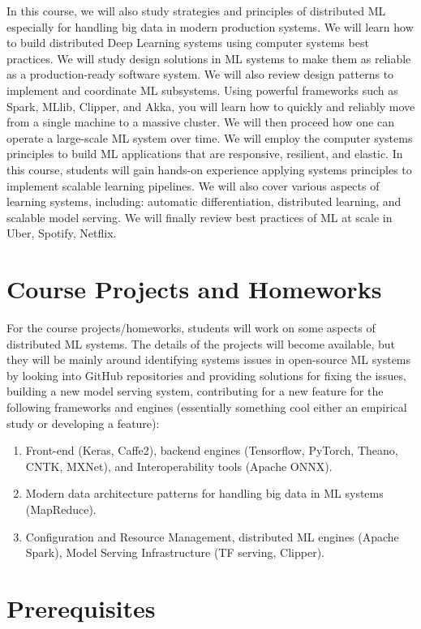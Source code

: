 \documentclass[11pt]{article}
\begin{document}
In this course, we will also study strategies and principles of distributed ML especially for handling big data in modern production systems. We will learn how to build distributed Deep Learning systems using computer systems best practices. We will study design solutions in ML systems to make them as reliable as a production-ready software system. We will also review design patterns to implement and coordinate ML subsystems. Using powerful frameworks such as Spark, MLlib, Clipper, and Akka, you will learn how to quickly and reliably move from a single machine to a massive cluster. We will then proceed how one can operate a large-scale ML system over time. We will employ the computer systems principles to build ML applications that are responsive, resilient, and elastic. In this course, students will gain hands-on experience applying systems principles to implement scalable learning pipelines. We will also cover various aspects of learning systems, including: automatic differentiation, distributed learning, and scalable model serving. We will finally review best practices of ML at scale in Uber, Spotify, Netflix. 


\section*{Course Projects and Homeworks}

For the course projects/homeworks, students will work on some aspects of distributed ML systems. The details of the projects will become available, but they will be mainly around identifying systems issues in open-source ML systems by looking into GitHub repositories and providing solutions for fixing the issues, building a new model serving system, contributing for a new feature for the following frameworks and engines (essentially something cool either an empirical study or developing a feature):
\begin{enumerate}
\item Front-end (Keras, Caffe2), backend engines (Tensorflow, PyTorch, Theano, CNTK, MXNet), and Interoperability tools (Apache ONNX).
\item Modern data architecture patterns for handling big data in ML systems (MapReduce).
\item Configuration and Resource Management, distributed ML engines (Apache Spark), Model Serving Infrastructure (TF serving, Clipper).
\end{enumerate}


\section*{Prerequisites}
\end{document}
